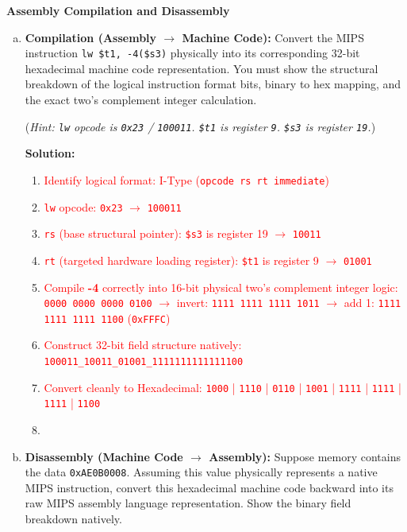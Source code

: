 \documentclass[letterpaper]{report}
\begin{document}
\ep
\vf
\newpage

%
 {\bf Assembly Compilation and Disassembly}
\begin{enumerate}[(a)]
    \item \textbf{Compilation (Assembly $\rightarrow$ Machine Code):} Convert the MIPS instruction \texttt{lw \$t1, -4(\$s3)} physically into its corresponding 32-bit hexadecimal machine code representation. You must show the structural breakdown of the logical instruction format bits, binary to hex mapping, and the exact two's complement integer calculation.
    
    (\textit{Hint: \texttt{lw} opcode is \texttt{0x23} / \texttt{100011}. \texttt{\$t1} is register \texttt{9}. \texttt{\$s3} is register \texttt{19}.})
    
    {\color{red} \textbf{Solution:}}
    \begin{enumerate}
        \item \textcolor{red}{Identify logical format: I-Type (\texttt{opcode rs rt immediate})}
        \item \textcolor{red}{\texttt{lw} opcode: \texttt{0x23} $\rightarrow$ \texttt{100011}}
        \item \textcolor{red}{\texttt{rs} (base structural pointer): \texttt{\$s3} is register 19 $\rightarrow$ \texttt{10011}}
        \item \textcolor{red}{\texttt{rt} (targeted hardware loading register): \texttt{\$t1} is register 9 $\rightarrow$ \texttt{01001}}
        \item \textcolor{red}{Compile \textbf{-4} correctly into 16-bit physical two's complement integer logic: \texttt{0000 0000 0000 0100} $\rightarrow$ invert: \texttt{1111 1111 1111 1011} $\rightarrow$ add 1: \texttt{1111 1111 1111 1100} (\texttt{0xFFFC})}
        \item \textcolor{red}{Construct 32-bit field structure natively: \texttt{100011\_10011\_01001\_1111111111111100}}
        \item \textcolor{red}{Convert cleanly to Hexadecimal: \texttt{1000} | \texttt{1110} | \texttt{0110} | \texttt{1001} | \texttt{1111} | \texttt{1111} | \texttt{1111} | \texttt{1100}}
        \item {}
    \end{enumerate}

    \item \textbf{Disassembly (Machine Code $\rightarrow$ Assembly):} Suppose memory contains the data \texttt{0xAE0B0008}. Assuming this value physically represents a native MIPS instruction, convert this hexadecimal machine code backward into its raw MIPS assembly language representation. Show the binary field breakdown natively.
    

\end{enumerate}
\end{document}

